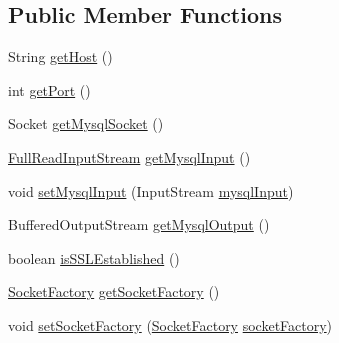 \subsection*{Public Member Functions}
\begin{DoxyCompactItemize}
\item 
String \mbox{\hyperlink{classcom_1_1mysql_1_1cj_1_1protocol_1_1_abstract_socket_connection_a71d1b8dda2033fdf3c7a9715f0e64414}{get\+Host}} ()
\item 
int \mbox{\hyperlink{classcom_1_1mysql_1_1cj_1_1protocol_1_1_abstract_socket_connection_aab3a20dd6812f375dfa5050f8c056384}{get\+Port}} ()
\item 
Socket \mbox{\hyperlink{classcom_1_1mysql_1_1cj_1_1protocol_1_1_abstract_socket_connection_a0600ad7876a12ee7a8c8122c4b277e91}{get\+Mysql\+Socket}} ()
\item 
\mbox{\hyperlink{classcom_1_1mysql_1_1cj_1_1protocol_1_1_full_read_input_stream}{Full\+Read\+Input\+Stream}} \mbox{\hyperlink{classcom_1_1mysql_1_1cj_1_1protocol_1_1_abstract_socket_connection_acb0fa6da1b08c40358e83dbc1e8867e7}{get\+Mysql\+Input}} ()
\item 
void \mbox{\hyperlink{classcom_1_1mysql_1_1cj_1_1protocol_1_1_abstract_socket_connection_aa2906d26ec2dfc16c8cbbd983bb80849}{set\+Mysql\+Input}} (Input\+Stream \mbox{\hyperlink{classcom_1_1mysql_1_1cj_1_1protocol_1_1_abstract_socket_connection_a8e7f00881c12ca5a9424a24fa567cb85}{mysql\+Input}})
\item 
Buffered\+Output\+Stream \mbox{\hyperlink{classcom_1_1mysql_1_1cj_1_1protocol_1_1_abstract_socket_connection_a7ca82cf4b1a73e5fa06fcaa01ab8a887}{get\+Mysql\+Output}} ()
\item 
boolean \mbox{\hyperlink{classcom_1_1mysql_1_1cj_1_1protocol_1_1_abstract_socket_connection_ab427edda7170bd3a5a405e5d50bfd50d}{is\+S\+S\+L\+Established}} ()
\item 
\mbox{\hyperlink{interfacecom_1_1mysql_1_1cj_1_1protocol_1_1_socket_factory}{Socket\+Factory}} \mbox{\hyperlink{classcom_1_1mysql_1_1cj_1_1protocol_1_1_abstract_socket_connection_a1f81e05b320d5aad420032fcfd74d9a3}{get\+Socket\+Factory}} ()
\item 
void \mbox{\hyperlink{classcom_1_1mysql_1_1cj_1_1protocol_1_1_abstract_socket_connection_a33c399d3a62154183561e8807bf4dcc5}{set\+Socket\+Factory}} (\mbox{\hyperlink{interfacecom_1_1mysql_1_1cj_1_1protocol_1_1_socket_factory}{Socket\+Factory}} \mbox{\hyperlink{classcom_1_1mysql_1_1cj_1_1protocol_1_1_abstract_socket_connection_a8933d154a7c6d4c09ad58d50e757339c}{socket\+Factory}})

\end{DoxyCompactItemize}
